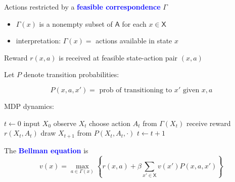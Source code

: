 \documentclass[xcolor=dvipsnames]{beamer}
\newcommand{\navy}[1]{\textcolor{Blue}{\bf #1}}
\newcommand{\Asf}{\mathsf A}
\newcommand{\Xsf}{\mathsf X}
\newcommand{\1}{\mathbbm 1}
\begin{document}
\begin{frame}

    Actions restricted by a \navy{feasible correspondence} $\Gamma$

    \begin{itemize}
        \item $\Gamma(x)$ is a nonempty subset of $\Asf$ for each $x \in \Xsf$ 
    \vspace{0.5em}
        \item interpretation: $\Gamma(x) =$ actions available in state $x$
    \end{itemize}

    \vspace{0.5em}
    \vspace{0.5em}

    Reward $r(x, a)$ is received at feasible state-action pair $(x, a)$

    \vspace{0.5em}

    Let $P$ denote transition probabilities:

    \begin{equation*}
        P(x, a, x') = \text{ prob of transitioning to $x'$ given $x, a$}
    \end{equation*}


\end{frame}


\begin{frame}

    MDP dynamics:
    
    \vspace{0.4em}
    \vspace{0.4em}

    \begin{algorithm}[H]
        \DontPrintSemicolon
        $t \leftarrow 0$ \;
        input $X_0$ \;
        {
            observe $X_t$   \;
            choose action $A_t$ from $\Gamma(X_t)$  \;
            receive reward $r(X_t, A_t)$   \;
            draw $X_{t+1}$ from $P(X_t, A_t, \cdot)$   \;
            $t \leftarrow t + 1$ \;
        }
    \end{algorithm}


\end{frame}



\begin{frame}
    
    The \navy{Bellman equation} is
    \begin{equation*}
            v(x)
            = \max_{a \in \Gamma(x)}
            \left\{
                r(x, a)
                + \beta
                \sum_{x' \in \Xsf} v(x') P(x, a, x')
            \right\}
    \end{equation*}


\end{frame}
\end{document}
